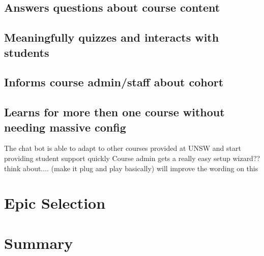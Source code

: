 \documentclass{article}
\begin{document}
\subsection{Answers questions about course content}


\subsection{Meaningfully quizzes and interacts with students}


\subsection{Informs course admin/staff about cohort}


\subsection{Learns for more then one course without needing massive config}
The chat bot is able to adapt to other courses provided at UNSW and start providing student support quickly 
Course admin gets a really easy setup wizard?? think about.... 
(make it plug and play basically)   will improve the wording on this


\section{Epic Selection}

\section{Summary}
\end{document}
